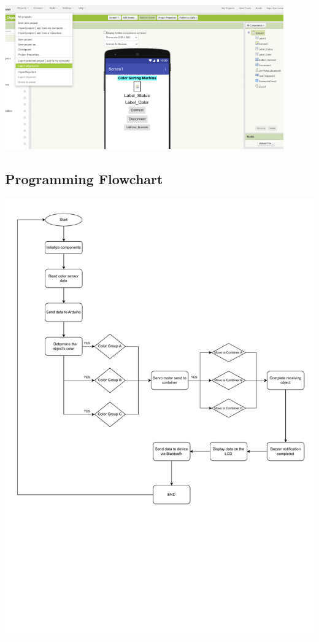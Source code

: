 \documentclass[conference, onecolumn]{IEEEtran}
\begin{document}
\begin{center}
    \includegraphics[width=0.9\textwidth]{Export selected project.png}
    \label{fig1}
    \end{center}
      \vspace{3em}
\noindent
\clearpage

\subsection{Programming Flowchart}
\begin{center}
    \includegraphics[width=1\textwidth, trim=0 7cm 0 0, clip]{IOT-Color-Based Object Sorting Machine/Flow_Chart.pdf}
    \label{fig1}
\end{center}
\noindent
\end{document}
